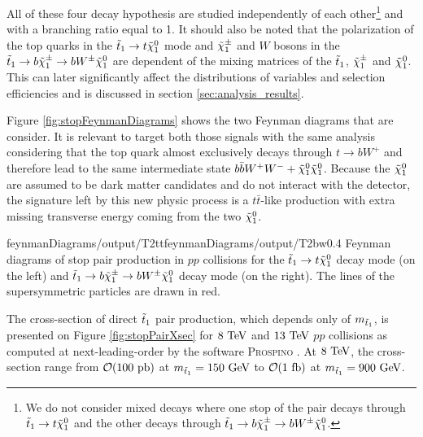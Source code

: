         All of these four decay hypothesis are studied independently
        of each other\footnote{We do not consider mixed decays where one stop of the pair 
        decays through $\tilde{t}_1 \rightarrow t \tilde{\chi}_1^0$ and the other decays through 
        $\tilde{t}_1 \rightarrow b \tilde{\chi}_1^\pm \rightarrow b W^{\pm} \tilde{\chi}_1^0$.} and with a 
        branching ratio equal to 1. It should also be noted that the polarization of the 
        top quarks in the $\tilde{t}_1 \rightarrow t \tilde{\chi}_1^0$ mode and $\tilde{\chi}_1^\pm$ and 
        $W$ bosons in the $\tilde{t}_1 \rightarrow b \tilde{\chi}_1^\pm \rightarrow b W^{\pm} 
        \tilde{\chi}_1^0$ are dependent of the mixing matrices of the $\tilde{t}_1$, $\tilde{\chi}_1^\pm$ 
        and $\tilde{\chi}_1^0$. This can later significantly affect the distributions of 
        variables and selection efficiencies and is discussed in section 
        \ref{sec:analysis_results}.

        Figure \ref{fig:stopFeynmanDiagrams} shows the two Feynman diagrams that are consider. It is relevant
        to target both those signals with the same analysis considering that the top quark almost exclusively
        decays through $t \rightarrow b W^+$ and therefore lead to the same intermediate state 
        $b \bar{b} W^+ W^- + \tilde{\chi}_1^0 \tilde{\chi}_1^0$. Because the $\tilde{\chi}_1^0$ are assumed to be dark matter
        candidates and do not interact with the detector, the signature left by this new physic process
        is a $t\bar{t}$-like production with extra missing transverse energy coming from the two $\tilde{\chi}_1^0$.

                         {feynmanDiagrams/output/T2tt}{feynmanDiagrams/output/T2bw}{0.4}
                         {Feynman diagrams of stop pair production in $pp$ collisions for the 
                         $\tilde{t}_1 \rightarrow t \tilde{\chi}_1^0$ decay mode (on the left) and 
                         $\tilde{t}_1 \rightarrow b \tilde{\chi}_1^\pm \rightarrow b W^{\pm} \tilde{\chi}_1^0$ decay mode 
                         (on the right). The lines of the supersymmetric particles are drawn in red.}

        The cross-section of direct $\tilde{t}_1$ pair production, which depends only of $m_{\tilde{t}_1}$, is presented 
        on Figure \ref{fig:stopPairXsec} for $8~\text{TeV}$ and $13~\text{TeV}$ $pp$ collisions as computed at next-leading-order 
        by the software \textsc{Prospino} . At $8~\text{TeV}$, the cross-section range from $\mathcal{O}(100~\text{pb})$
        at $m_{\tilde{t}_1} = 150~\text{GeV}$ to $\mathcal{O}(1~\text{fb})$ at $m_{\tilde{t}_1} = 900 ~\text{GeV}$.

